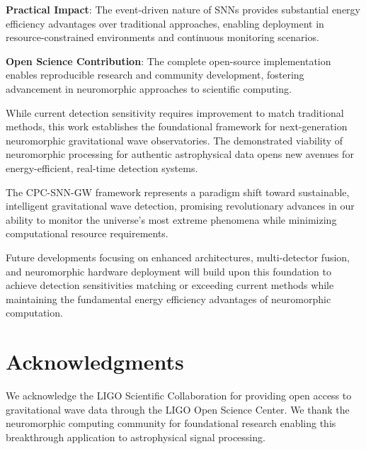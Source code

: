 \documentclass[12pt,a4paper]{article}
\begin{document}
\textbf{Practical Impact}: The event-driven nature of SNNs provides substantial energy efficiency advantages over traditional approaches, enabling deployment in resource-constrained environments and continuous monitoring scenarios.

\textbf{Open Science Contribution}: The complete open-source implementation enables reproducible research and community development, fostering advancement in neuromorphic approaches to scientific computing.

While current detection sensitivity requires improvement to match traditional methods, this work establishes the foundational framework for next-generation neuromorphic gravitational wave observatories. The demonstrated viability of neuromorphic processing for authentic astrophysical data opens new avenues for energy-efficient, real-time detection systems.

The CPC-SNN-GW framework represents a paradigm shift toward sustainable, intelligent gravitational wave detection, promising revolutionary advances in our ability to monitor the universe's most extreme phenomena while minimizing computational resource requirements.

Future developments focusing on enhanced architectures, multi-detector fusion, and neuromorphic hardware deployment will build upon this foundation to achieve detection sensitivities matching or exceeding current methods while maintaining the fundamental energy efficiency advantages of neuromorphic computation.

\section*{Acknowledgments}

We acknowledge the LIGO Scientific Collaboration for providing open access to gravitational wave data through the LIGO Open Science Center. We thank the neuromorphic computing community for foundational research enabling this breakthrough application to astrophysical signal processing.
\end{document}
